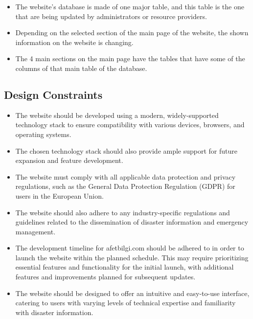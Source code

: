 \documentclass[11pt,a4paper]{article}
\begin{document}
\begin{itemize}
    \item The website's database is made of one major table, and this table is the one that are being updated by administrators or resource providers.
    \item Depending on the selected section of the main page of the website, the shown information on the website is changing.
    \item The 4 main sections on the main page have the tables that have some of the columns of that main table of the database.
\end{itemize}

\newpage

\subsection{Design Constraints}
\begin{itemize}
    \item The website should be developed using a modern, widely-supported technology stack to ensure compatibility with various devices, browsers, and operating systems.
    \item The chosen technology stack should also provide ample support for future expansion and feature development.
    \item The website must comply with all applicable data protection and privacy regulations, such as the General Data Protection Regulation (GDPR) for users in the European Union.
    \item The website should also adhere to any industry-specific regulations and guidelines related to the dissemination of disaster information and emergency management.
    \item The development timeline for afetbilgi.com should be adhered to in order to launch the website within the planned schedule. This may require prioritizing essential features and functionality for the initial launch, with additional features and improvements planned for subsequent updates.
    \item The website should be designed to offer an intuitive and easy-to-use interface, catering to users with varying levels of technical expertise and familiarity with disaster information.
\end{itemize}
\end{document}
